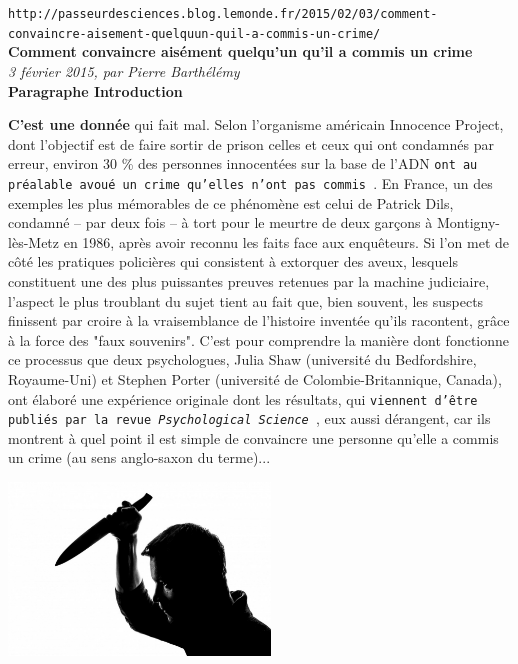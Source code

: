 \documentclass[11pt,twoside,a4paper]{article}
\begin{document}
\setlength\parindent{0pt}

\texttt{http://passeurdesciences.blog.lemonde.fr/2015/02/03/comment-convaincre-aisement-quelquun-quil-a-commis-un-crime/}~\\

\textbf{\LARGE Comment convaincre ais{\'e}ment quelqu'un qu'il a commis un crime} ~\\

\emph{\small  3 f{\'e}vrier 2015, par Pierre Barth{\'e}l{\'e}my	} ~\\

\textbf{Paragraphe Introduction } ~\\

\begin{minipage}[ht]{0.65\textwidth}
	\textbf{C'est une donn{\'e}e} qui fait mal. Selon l'organisme am{\'e}ricain Innocence Project, dont l'objectif est de faire sortir de prison celles et ceux qui ont condamn{\'e}s par erreur, environ 30 \% des personnes innocent{\'e}es sur la base de l'ADN \texttt{ont au pr{\'e}alable avou{\'e} un crime qu'elles n'ont pas commis~\footnotemark }. En France, un des exemples les plus m{\'e}morables de ce ph{\'e}nom{\`e}ne est celui de Patrick Dils, condamn{\'e} -- par deux fois -- {\`a} tort pour le meurtre de deux gar\c{c}ons {\`a} Montigny-l{\`e}s-Metz en 1986, apr{\`e}s avoir reconnu les faits face aux enqu{\^e}teurs. Si l'on met de c{\^o}t{\'e} les pratiques polici{\`e}res qui consistent {\`a} extorquer des aveux, lesquels constituent une des plus puissantes preuves retenues par la machine judiciaire, l'aspect le plus troublant du sujet tient au fait que, bien souvent, les suspects finissent par croire {\`a} la vraisemblance de l'histoire invent{\'e}e qu'ils racontent, gr{\^a}ce {\`a} la force des "faux souvenirs". C'est pour comprendre la mani{\`e}re dont fonctionne ce processus que deux psychologues, Julia Shaw (universit{\'e} du Bedfordshire, Royaume-Uni) et Stephen Porter (universit{\'e} de Colombie-Britannique, Canada), ont {\'e}labor{\'e} une exp{\'e}rience originale dont les r{\'e}sultats, qui \texttt{viennent d'{\^e}tre publi{\'e}s par la revue \emph{Psychological Science}~\footnotemark}, eux aussi d{\'e}rangent, car ils montrent {\`a} quel point il est simple de convaincre une personne qu'elle a commis un crime (au sens anglo-saxon du terme)... %
\end{minipage} \hfill \begin{minipage}[ht]{7.00cm}
	\includegraphics[width=6.95cm]{img/people-315910_1280-1024x678.jpg}

\end{minipage}
\end{document}
